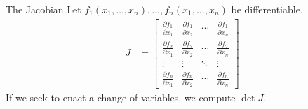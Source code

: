 \documentclass[8pt]{extarticle}
\begin{document}
  \begin{problem}{The Jacobian}
    Let $f_1(x_1,\dots,x_n),\dots,f_{n}(x_1,\dots,x_n)$ be differentiable.
    \begin{align*}
      J &= \begin{bmatrix}\frac{\partial f_1}{\partial x_1} & \frac{\partial f_1}{\partial x_2} & \cdots & \frac{\partial f_1}{\partial x_n}\\\frac{\partial f_2}{\partial x_1} & \frac{\partial f_2}{\partial x_2} & \cdots & \frac{\partial f_2}{\partial x_n}\\ \vdots & \vdots & \ddots & \vdots \\ \frac{\partial f_n}{\partial x_1} & \frac{\partial f_n}{\partial x_2} & \cdots & \frac{\partial f_n}{\partial x_n}\end{bmatrix}
    \end{align*}
    If we seek to enact a change of variables, we compute $\det{J}$.\\


\end{problem}
\end{document}
